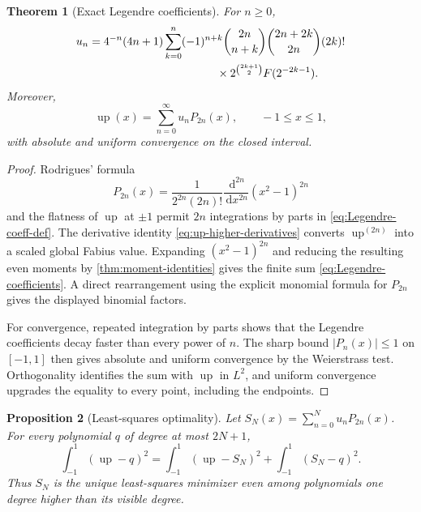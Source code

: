 \documentclass[11pt]{article}
\numberwithin{equation}{section}
\newtheorem{theorem}{Theorem}[section]
\newtheorem{proposition}[theorem]{Proposition}
\theoremstyle{definition}
\theoremstyle{remark}
\newcommand{\upf}{\operatorname{up}}
\newcommand{\dd}{\,\mathrm d}
\begin{document}
\begin{theorem}[Exact Legendre coefficients]\label{thm:Legendre-coefficients}
For $n\ge0$,
\begin{equation}\label{eq:Legendre-coefficients}
\begin{split}
 u_n={}&4^{-n}(4n+1)\sum_{k=0}^{n}(-1)^{n+k}
 \binom{2n}{n+k}\binom{2n+2k}{2n}(2k)!\\
 &\hspace{35mm}\times 2^{\binom{2k+1}{2}}F(2^{-2k-1}).
\end{split}
\end{equation}
Moreover,
\begin{equation}\label{eq:Legendre-series}
 \upf(x)=\sum_{n=0}^{\infty}u_nP_{2n}(x),\qquad -1\le x\le1,
\end{equation}
with absolute and uniform convergence on the closed interval.
\end{theorem}

\begin{proof}
Rodrigues' formula
\[
 P_{2n}(x)=\frac{1}{2^{2n}(2n)!}\frac{\dd^{2n}}{\dd x^{2n}}(x^2-1)^{2n}
\]
and the flatness of $\upf$ at $\pm1$ permit $2n$ integrations by parts in \eqref{eq:Legendre-coeff-def}.  The derivative identity \eqref{eq:up-higher-derivatives} converts $\upf^{(2n)}$ into a scaled global Fabius value.  Expanding $(x^2-1)^{2n}$ and reducing the resulting even moments by \cref{thm:moment-identities} gives the finite sum \eqref{eq:Legendre-coefficients}.  A direct rearrangement using the explicit monomial formula for $P_{2n}$ gives the displayed binomial factors.

For convergence, repeated integration by parts shows that the Legendre coefficients decay faster than every power of $n$.  The sharp bound $|P_n(x)|\le1$ on $[-1,1]$ then gives absolute and uniform convergence by the Weierstrass test.  Orthogonality identifies the sum with $\upf$ in $L^2$, and uniform convergence upgrades the equality to every point, including the endpoints.
\end{proof}

\begin{proposition}[Least-squares optimality]\label{prop:Legendre-least-squares}
Let $S_N(x)=\sum_{n=0}^{N}u_nP_{2n}(x)$.  For every polynomial $q$ of degree at most $2N+1$,
\begin{equation}\label{eq:Legendre-Pythagorean}
 \int_{-1}^{1}(\upf-q)^2
 =\int_{-1}^{1}(\upf-S_N)^2+\int_{-1}^{1}(S_N-q)^2.
\end{equation}
Thus $S_N$ is the unique least-squares minimizer even among polynomials one degree higher than its visible degree.
\end{proposition}
\end{document}
